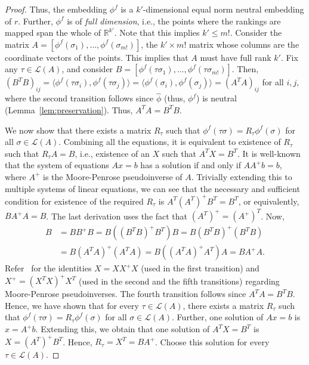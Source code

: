 \documentclass[10pt,letterpaper]{article}
\newcommand{\calL}{{\mathcal{L}}}
\newcommand{\rank}{{\calL(A)}}
\begin{document}
\begin{proof}
Thus, the embedding $\phi^f$ is a $k'$-dimensional equal norm neutral embedding of $r$. Further, $\phi^f$ is of \emph{full dimension}, i.e., the points where the rankings are mapped span the whole of $\mathbb{R}^{k'}$. Note that this implies $k' \le m!$. Consider the matrix $A = [\phi^f(\sigma_1), \ldots, \phi^f(\sigma_{m!})]$, the $k' \times m!$ matrix whose columns are the coordinate vectors of the points. This implies that $A$ must have full rank $k'$. Fix any $\tau \in \rank$, and consider $B = [\phi^f(\tau \sigma_1), \ldots, \phi^f(\tau \sigma_{m!})]$. Then, $(B^T B)_{ij} = \langle \phi^f(\tau \sigma_i), \phi^f(\tau \sigma_j) \rangle = \langle \phi^f(\sigma_i), \phi^f(\sigma_j) \rangle = (A^T A)_{ij}$ for all $i,j$, where the second transition follows since $\hat{\phi}$ (thus, $\phi^f$) is neutral (Lemma~\ref{lem:preservation}). Thus, $A^T A = B^T B$.

We now show that there exists a matrix $R_{\tau}$ such that $\phi^f(\tau \sigma) = R_{\tau} \phi^f(\sigma)$ for all $\sigma \in \rank$. Combining all the equations, it is equivalent to existence of $R_{\tau}$ such that $R_{\tau} A = B$, i.e., existence of an $X$ such that $A^T X = B^T$. It is well-known that the system of equations $Ax=b$ has a solution if and only if $AA^{+}b = b$, where $A^{+}$ is the Moore-Penrose pseudoinverse of $A$. Trivially extending this to multiple systems of linear equations, we can see that the necessary and sufficient condition for existence of the required $R_{\tau}$ is $A^T (A^T)^{+} B^T = B^T$, or equivalently, $B A^{+} A = B$. The last derivation uses the fact that $(A^T)^{+} = (A^{+})^T$. Now, 
\begin{align*}
B &= B B^{+} B = B \left( (B^T B)^{+} B^T \right) B = B (B^T B)^{+} \left( B^T B \right) \\
&= B (A^T A)^{+} \left( A^T A \right) = B \left( (A^T A)^{+} A^T \right) A = B A^{+} A.
\end{align*}
Refer~\cite{BH12} for the identities $X = X X^{+} X$ (used in the first transition) and $X^{+} = (X^T X)^{+} X^T$ (used in the second and the fifth transitions) regarding Moore-Penrose pseudoinverses. The fourth transition follows since $A^T A = B^T B$. Hence, we have shown that for every $\tau \in \rank$, there exists a matrix $R_{\tau}$ such that $\phi^f(\tau \sigma) = R_{\tau} \phi^f(\sigma)$ for all $\sigma \in \rank$. Further, one solution of $Ax=b$ is $x = A^{+}b$. Extending this, we obtain that one solution of $A^T X = B^T$ is $X = (A^T)^{+} B^T$. Hence, $R_{\tau} = X^T = BA^{+}$. Choose this solution for every $\tau \in \rank$. 


\end{proof}
\end{document}
